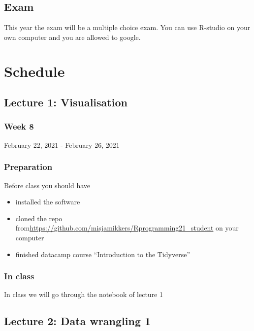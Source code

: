 \documentclass[
]{book}
\providecommand{\tightlist}{%
  \setlength{\itemsep}{0pt}\setlength{\parskip}{0pt}}
\begin{document}
\hypertarget{exam}{%
\section{Exam}\label{exam}}

This year the exam will be a multiple choice exam. You can use R-studio on your own computer and you are allowed to google.

\hypertarget{schedule}{%
\chapter{Schedule}\label{schedule}}

\hypertarget{lecture-1-visualisation}{%
\section{Lecture 1: Visualisation}\label{lecture-1-visualisation}}

\hypertarget{week-8}{%
\subsection{Week 8}\label{week-8}}

February 22, 2021 - February 26, 2021

\hypertarget{preparation}{%
\subsection{Preparation}\label{preparation}}

Before class you should have

\begin{itemize}
\tightlist
\item
  installed the software
\item
  cloned the repo from\url{https://github.com/misjamikkers/Rprogramming21_student} on your computer
\item
  finished datacamp course ``Introduction to the Tidyverse''
\end{itemize}

\hypertarget{in-class}{%
\subsection{In class}\label{in-class}}

In class we will go through the notebook of lecture 1

\hypertarget{lecture-2-data-wrangling-1}{%
\section{Lecture 2: Data wrangling 1}\label{lecture-2-data-wrangling-1}}
\end{document}
